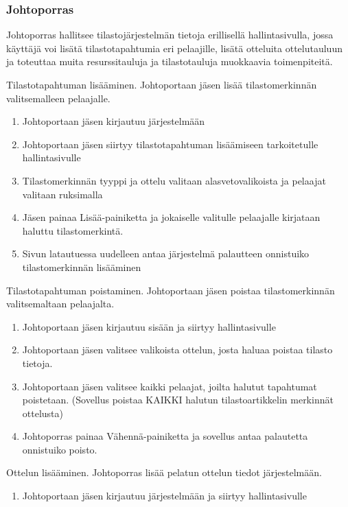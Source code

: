 \documentclass[12pt]{article} %
\begin{document}
\subsubsection{Johtoporras}
Johtoporras hallitsee tilastojärjestelmän tietoja erillisellä hallintasivulla, jossa käyttäjä voi lisätä tilastotapahtumia eri pelaajille, lisätä otteluita ottelutauluun ja toteuttaa muita resurssitauluja ja tilastotauluja muokkaavia toimenpiteitä.
\begin{enumerate}
\begin{item}
Tilastotapahtuman lisääminen. Johtoportaan jäsen lisää tilastomerkinnän valitsemalleen pelaajalle.
	\begin{enumerate}
		\item Johtoportaan jäsen kirjautuu järjestelmään 
		\item Johtoportaan jäsen siirtyy tilastotapahtuman lisäämiseen tarkoitetulle hallintasivulle
		\item Tilastomerkinnän tyyppi ja ottelu valitaan alasvetovalikoista ja pelaajat valitaan ruksimalla
		\item Jäsen painaa Lisää-painiketta ja jokaiselle valitulle pelaajalle kirjataan haluttu tilastomerkintä.
		\item Sivun latautuessa uudelleen antaa järjestelmä palautteen onnistuiko tilastomerkinnän lisääminen
	\end{enumerate}
\end{item}
\begin{item}
Tilastotapahtuman poistaminen. Johtoportaan jäsen poistaa tilastomerkinnän valitsemaltaan pelaajalta.
	\begin{enumerate}
		\item Johtoportaan jäsen kirjautuu sisään ja siirtyy hallintasivulle
		\item Johtoportaan jäsen valitsee valikoista ottelun, josta haluaa poistaa tilasto tietoja.
		\item Johtoportaan jäsen valitsee kaikki pelaajat, joilta halutut tapahtumat poistetaan. (Sovellus poistaa KAIKKI halutun tilastoartikkelin merkinnät ottelusta)
		\item Johtoporras painaa Vähennä-painiketta ja sovellus antaa palautetta onnistuiko poisto.
	\end{enumerate}
\end{item}
\begin{item}
Ottelun lisääminen. Johtoporras lisää pelatun ottelun tiedot järjestelmään.
	\begin{enumerate}
		\item Johtoportaan jäsen kirjautuu järjestelmään ja siirtyy hallintasivulle

\end{enumerate}
\end{item}
\end{enumerate}
\end{document}
